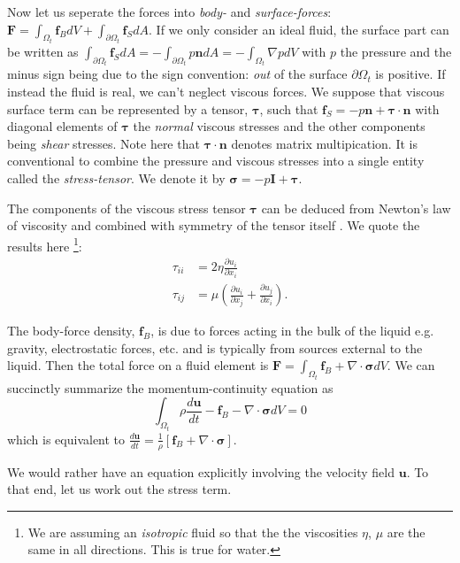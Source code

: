 \documentclass[rmp,aps,nofootinbib,superscriptaddress,floatfix]{revtex4-2}
\begin{document}
Now let us seperate the forces into \emph{body-} and \emph{surface-forces}: $\bm{F}=\int_{\Omega_t} \bm{f}_B dV+ \int_{\partial \Omega_t} \bm{f}_S dA $. If we only consider an ideal fluid, the surface part can be written as $\int_{\partial \Omega_t} \bm{f}_S dA =-\int_{\partial \Omega_t} p \bm{n} dA = -\int_{\Omega_t}\nabla p dV$ with $p$ the pressure  and the minus sign being due to the sign convention: \emph{out} of the surface $\partial \Omega_t$ is positive. If instead the fluid is real, we can't neglect viscous forces. We suppose that viscous surface term can be represented by a tensor, $\bm{\tau}$, such that $\bm{f}_S = -p\bm{n}+\bm{\tau} \cdot \bm{n}$ with diagonal elements of $\bm{\tau}$ the \emph{normal} viscous stresses and the other components being \emph{shear} stresses. Note here that $\bm{\tau} \cdot \bm{n}$ denotes matrix multipication. It is conventional to combine the pressure and viscous stresses into a single entity called the \emph{stress-tensor}. We denote it by $\bm{\sigma}=-p\bm{I}+\bm{\tau}$. 

The components of the viscous stress tensor $\bm{\tau}$ can be deduced from Newton's law of viscosity and combined with symmetry of the tensor itself \cite{mcdonough2009lectures}. We quote the results here \footnote{We are assuming an \emph{isotropic} fluid so that the the viscosities $\eta$, $\mu$ are the same in all directions. This is true for water.}:
\begin{align}
    \tau_{ii} & = 2 \eta \frac{\partial u_i}{\partial x_i} \\
    \tau_{ij} & =  \mu \left( \frac{\partial u_i}{\partial x_j}+\frac{\partial u_j}{\partial x_i} \right).
\end{align}

The body-force density, $\bm{f}_B$, is due to forces acting in the bulk of the liquid e.g. gravity, electrostatic forces, etc. and is typically from sources external to the liquid. Then the total force on a fluid element is $\bm{F}=\int_{\Omega_t} \bm{f}_B+\nabla \cdot \bm{\sigma} dV$. We can succinctly summarize the momentum-continuity equation as
\begin{equation}
    \int_{\Omega_t} \rho \frac{d \bm{u}}{dt}-\bm{f}_B-\nabla \cdot \bm{\sigma} dV =0
\end{equation}
which is equivalent to $\frac{d \bm{u}}{dt}=\frac{1}{\rho}\left[ \bm{f}_B+\nabla \cdot \bm{\sigma} \right]$. 

We would rather have an equation explicitly involving the velocity field $\bm{u}$. To that end, let us work out the stress term.
\end{document}
